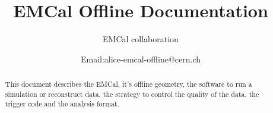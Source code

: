 \documentclass[ALICE,manyauthors]{ALICE_internal_notes}
\begin{document}
%
%
%
\begin{titlepage}

\title{EMCal Offline Documentation}
%
\author{EMCal collaboration}

\author{Email:alice-emcal-offline@cern.ch }
%
%

\begin{abstract}
This document describes the EMCal, it's offline geometry, the software to run a simulation or reconstruct data, the strategy to control the quality of the data, the trigger code and the analysis format.
\end{abstract}
\end{titlepage}
%
\maketitle
\tableofcontents

\newpage



\newpage


\clearpage


\clearpage


\clearpage


\clearpage


\clearpage


\clearpage


\clearpage


\clearpage


\clearpage
\end{document}
